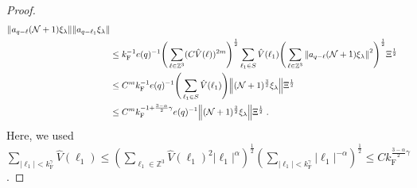\documentclass[12pt,a4paper]{article}
\numberwithin{equation}{section}
\newcommand{\1}{\mathbb{I}}
\newcommand{\F}{\mathrm{F}}
\newcommand{\kF}{k_\F}
\newcommand{\Zstar}{\mathbb{Z}^3} %
\newcommand{\Z}{\mathbb{Z}}
\newcommand{\NN}{\mathcal{N}}
\newcommand{\half}{\frac{1}{2}}
\theoremstyle{plain}
\theoremstyle{definition}
\theoremstyle{remark}
\theoremstyle{plain}
\theoremstyle{definition}
\theoremstyle{remark}
\begin{document}
\begin{proof}
\begin{align}
		\norm{ a_{q-\ell} (\NN+1) \xi_\lambda}
		\norm{ a_{q-\ell_1} \xi_\lambda }\nonumber\\
	&\leq \kF^{-1} e(q)^{-1}
		\Bigg( \sum_{\ell \in \Zstar} (C \hat{V}(\ell))^{2m} \Bigg)^{\half}
		\sum_{\ell_1 \in S} \hat{V}(\ell_1)
		\Bigg( \sum_{\ell \in \Z^3} \norm{ a_{q-\ell} (\NN+1) \xi_\lambda}^2 \Bigg)^{\half}
		\Xi^{\half} \nonumber\\
	&\leq C^m \kF^{-1} e(q)^{-1}
		\Bigg( \sum_{\ell_1 \in S} \hat{V}(\ell_1) \Bigg) \norm{(\NN+1)^{\frac 32} \xi_\lambda} \Xi^{\half} \nonumber\\
	&\leq C^m \kF^{-1 + \frac{3-\alpha}{2} \gamma} e(q)^{-1}
		\norm{(\NN+1)^{\frac 32} \xi_\lambda} \Xi^{\half} \;. \label{eq:estEQ2113_Coulomb_2}
\end{align}
Here, we used $ \sum_{|\ell_1| < \kF^\gamma} \hat{V}(\ell_1) \le \left( \sum_{\ell_1 \in \Zstar} \hat{V}(\ell_1)^2 |\ell_1|^\alpha \right)^{\half} \left( \sum_{|\ell_1| < \kF^\gamma} |\ell_1|^{-\alpha} \right)^{\half} \le C \kF^{\frac{3-\alpha}{2} \gamma} $.


\end{proof}
\end{document}
